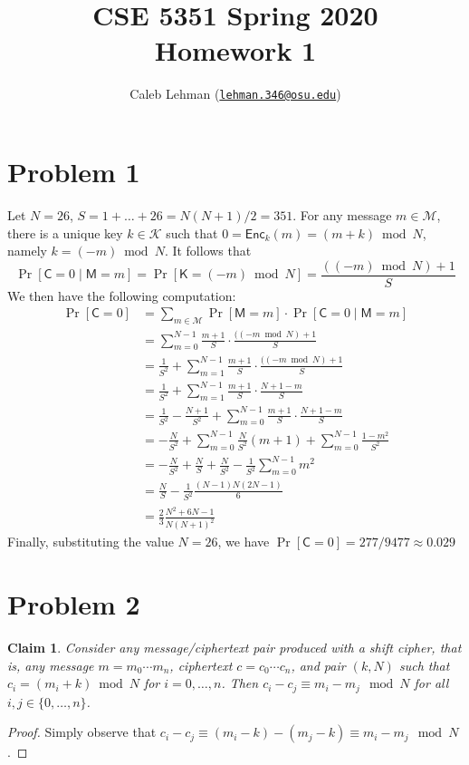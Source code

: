 \documentclass[12pt]{article}
\title{%
CSE 5351 Spring 2020\\
Homework 1
}
\author{%
Caleb Lehman
(\href{mailto:lehman.346@osu.edu}{\texttt{lehman.346@osu.edu}})
}
\date{%
}
\numberwithin{equation}{section}
\theoremstyle{plain}
\newtheorem{claim}{Claim}
\newcommand{\set}[1]{\{ #1 \}}
\DeclareMathOperator*{\prob}{Pr}
\newcommand{\given}{\mid}
\newcommand{\ctext}{\algo{C}}
\newcommand{\ptexts}{\mathcal{M}}
\newcommand{\ptext}{\algo{M}}
\newcommand{\keys}{\mathcal{K}}
\newcommand{\key}{\algo{K}}
\newcommand{\algo}[1]{\mathsf{#1}}
\newcommand{\enc}{\algo{Enc}}
\begin{document}
\maketitle

\section*{Problem 1}

Let $N = 26$, $S = 1 + \ldots + 26 = N(N+1) / 2 = 351$.
For any message $m \in \ptexts$,
there is a unique key $k \in \keys$ such that $0 = \enc_k(m) = (m + k) \bmod N$,
namely $k = (-m) \bmod N$.
It follows that
\begin{equation*}
    \prob[\ctext = 0 \given \ptext = m] = \prob[\key = (-m) \bmod N] = \frac{((-m) \bmod N) + 1}{S}
\end{equation*}
We then have the following computation:
\begin{align*}
    \prob[\ctext = 0]
        &= \sum_{m \in \ptexts}{ \prob[\ptext = m] \cdot \prob[\ctext = 0 \given \ptext = m] } \\
        &= \sum_{m = 0}^{N-1}{ \frac{m + 1}{S} \cdot \frac{((-m \bmod N) + 1}{S} } \\
        &= \frac{1}{S^2} + \sum_{m = 1}^{N-1}{ \frac{m + 1}{S} \cdot \frac{((-m \bmod N) + 1}{S} } \\
        &= \frac{1}{S^2} + \sum_{m = 1}^{N-1}{ \frac{m + 1}{S} \cdot \frac{N+1-m}{S} } \\
        &= \frac{1}{S^2} - \frac{N + 1}{S^2} + \sum_{m = 0}^{N-1}{ \frac{m + 1}{S} \cdot \frac{N+1-m}{S} } \\
        &= -\frac{N}{S^2} + \sum_{m = 0}^{N-1}{ \frac{N}{S^2} (m+1) } + \sum_{m = 0}^{N-1}{ \frac{1 - m^2}{S^2} } \\
        &= -\frac{N}{S^2} + \frac{N}{S} + \frac{N}{S^2} - \frac{1}{S^2} \sum_{m = 0}^{N-1}{ m^2 } \\
        &= \frac{N}{S} - \frac{1}{S^2} \frac{(N-1)N(2N-1)}{6} \\
        &= \frac{2}{3} \frac{N^2 + 6N - 1}{N(N+1)^2}
\end{align*}
Finally, substituting the value $N = 26$, we have $\prob[\ctext = 0] = 277 / 9477 \approx 0.029$


\section*{Problem 2}

\begin{claim}\label{claim:shift-cipher-property}
Consider any message/ciphertext pair produced with a shift cipher,
that is,
any message $m = m_0 \cdots m_n$,
ciphertext $c = c_0 \cdots c_n$,
and pair $(k, N)$
such that $c_i = (m_i + k) \bmod N$ for $i = 0, \ldots, n$.
Then $c_i - c_j \equiv m_i - m_j \mod N$
for all $i, j \in \set{ 0, \ldots, n }$.
\end{claim}
\begin{proof}
Simply observe that $c_i - c_j \equiv (m_i - k) - (m_j - k) \equiv m_i - m_j \mod N$.
\end{proof}
\end{document}
